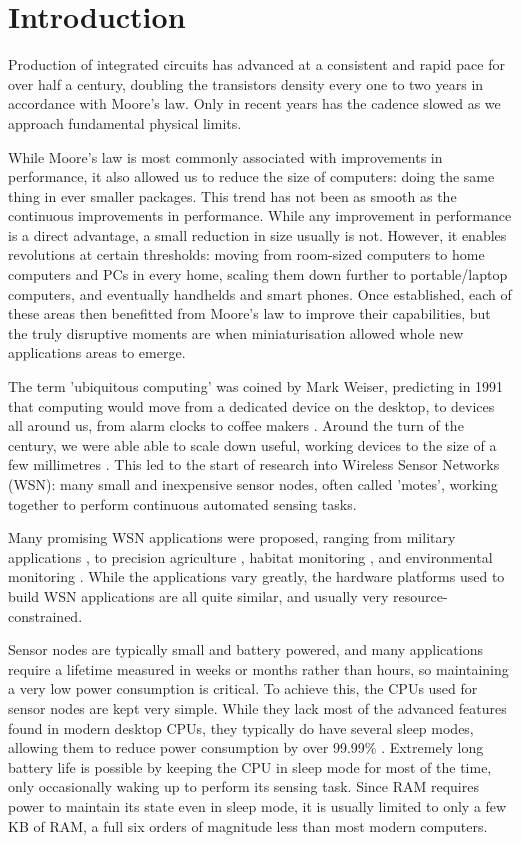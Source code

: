 \chapter{Introduction}
\label{sec-introduction}

Production of integrated circuits has advanced at a consistent and rapid pace for over half a century, doubling the transistors density every one to two years in accordance with Moore's law. Only in recent years has the cadence slowed as we approach fundamental physical limits.

While Moore's law is most commonly associated with improvements in performance, it also allowed us to reduce the size of computers: doing the same thing in ever smaller packages. This trend has not been as smooth as the continuous improvements in performance. While any improvement in performance is a direct advantage, a small reduction in size usually is not. However, it enables revolutions at certain thresholds: moving from room-sized computers to home computers and PCs in every home,  scaling them down further to portable/laptop computers, and eventually handhelds and smart phones. Once established, each of these areas then benefitted from Moore's law to improve their capabilities, but the truly disruptive moments are when miniaturisation allowed whole new applications areas to emerge.

The term 'ubiquitous computing' was coined by Mark Weiser, predicting in 1991 that computing would move from a dedicated device on the desktop, to devices all around us, from alarm clocks to coffee makers \cite{Weiser:1991wz}. Around the turn of the century, we were able able to scale down useful, working devices to the size of a few millimetres \cite{Warneke:2001ui}. This led to the start of research into Wireless Sensor Networks (WSN): many small and inexpensive sensor nodes, often called 'motes', working together to perform continuous automated sensing tasks.

Many promising WSN applications were proposed, ranging from military applications \cite{Arora:2004}, to precision agriculture \cite{Langendoen:2006un}, habitat monitoring \cite{Mainwaring:2002wb}, and environmental monitoring \cite{WernerAllen:2006ta, Chang:2010ek}. While the applications vary greatly, the hardware platforms used to build WSN applications are all quite similar, and usually very resource-constrained.

Sensor nodes are typically small and battery powered, and many applications require a lifetime measured in weeks or months rather than hours, so maintaining a very low power consumption is critical. To achieve this, the CPUs used for sensor nodes are kept very simple. While they lack most of the advanced features found in modern desktop CPUs, they typically do have several sleep modes, allowing them to reduce power consumption by over 99.99\% \cite{Atmel:ATmega128Datasheet}. Extremely long battery life is possible by keeping the CPU in sleep mode for most of the time, only occasionally waking up to perform its sensing task. Since RAM requires power to maintain its state even in sleep mode, it is usually limited to only a few KB of RAM, a full six orders of magnitude less than most modern computers.

